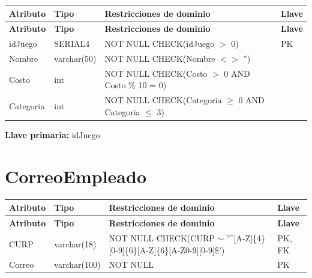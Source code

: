 \documentclass[12pt]{article}
\begin{document}
\begin{longtable}{p{3.5cm} p{2.5cm} p{7.5cm} p{1.5cm}}
\label{tab:juego}\\
\toprule
\textbf{Atributo} & \textbf{Tipo} & \textbf{Restricciones de dominio} & \textbf{Llave} \\
\midrule
\endfirsthead

\toprule
\textbf{Atributo} & \textbf{Tipo} & \textbf{Restricciones de dominio} & \textbf{Llave} \\
\midrule
\endhead

\bottomrule
\endfoot

idJuego 
& SERIAL4
& NOT NULL \newline CHECK(idJuego $>$ 0)
& PK \\

Nombre 
& varchar(50)
& NOT NULL \newline CHECK(Nombre $<>$ '')
& \\

Costo 
& int
& NOT NULL \newline CHECK(Costo $>$ 0 AND Costo \% 10 = 0)
& \\

Categoria 
& int
& NOT NULL \newline CHECK(Categoria $\geq$ 0 AND Categoria $\leq$ 3)
& \\

\end{longtable}

\vspace{2pt}
\textbf{Llave primaria:} idJuego\\

\section*{CorreoEmpleado}

\begin{longtable}{p{3.5cm} p{2.5cm} p{7.5cm} p{1.5cm}}
\label{tab:correoempleado}\\
\toprule
\textbf{Atributo} & \textbf{Tipo} & \textbf{Restricciones de dominio} & \textbf{Llave} \\
\midrule
\endfirsthead

\toprule
\textbf{Atributo} & \textbf{Tipo} & \textbf{Restricciones de dominio} & \textbf{Llave} \\
\midrule
\endhead

\bottomrule
\endfoot

CURP 
& varchar(18) 
& NOT NULL \newline CHECK(CURP $\sim$ '\^{}[A-Z]\{4\}[0-9]\{6\}[A-Z]\{6\}[A-Z0-9][0-9]\$')
& PK, FK \\

Correo 
& varchar(100) 
& NOT NULL
& PK \\

\end{longtable}
\end{document}
